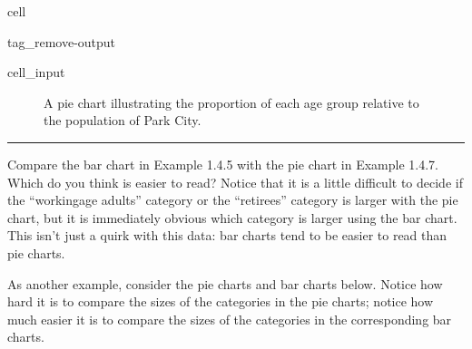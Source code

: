 \documentclass[letterpaper,10pt,english]{jupyterBook}
\begin{document}
\begin{sphinxuseclass}{cell}
\begin{sphinxuseclass}{tag_remove-output}\begin{sphinxVerbatimInput}

\begin{sphinxuseclass}{cell_input}
\begin{sphinxVerbatim}[commandchars=\\\{\}]

\end{sphinxVerbatim}

\end{sphinxuseclass}\end{sphinxVerbatimInput}

\end{sphinxuseclass}
\end{sphinxuseclass}
\begin{figure}[htbp]
\centering
\capstart

\noindent{}
\caption{A pie chart illustrating the proportion of each age group relative to the population of Park City.}\label{\detokenize{Ch1 Sampling and Data/1.4 Tables and Charts:park-city-piechart}}\end{figure}


\bigskip\hrule\bigskip


\sphinxAtStartPar
Compare the bar chart in Example 1.4.5 with the pie chart in Example 1.4.7. Which do you think is easier to read? Notice that it is a little difficult to decide if the “working\sphinxhyphen{}age adults” category or the “retirees” category is larger with the pie chart, but it is immediately obvious which category is larger using the bar chart. This isn’t just a quirk with this data: bar charts tend to be easier to read than pie charts.

\sphinxAtStartPar
As another example, consider the pie charts and bar charts below. Notice how hard it is to compare the sizes of the categories in the pie charts; notice how much easier it is to compare the sizes of the categories in the corresponding bar charts.
\end{document}
